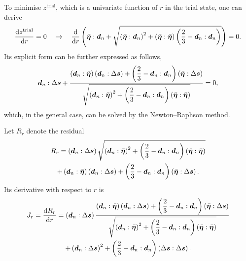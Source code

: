 To minimise $z^\text{trial}$, which is a univariate function of $r$ in the trial state, one can derive
\begin{gather}
    \dfrac{\mathrm{d}z^\text{trial}}{\mathrm{d}r}=0\quad\rightarrow\quad
    \dfrac{\mathrm{d}}{\mathrm{d}r}\left(\bar{\bm{\eta}}:\bm{d}_n+\sqrt{\left(\bar{\bm{\eta}}:\bm{d}_n\right)^2+\left(\bar{\bm{\eta}}:\bar{\bm{\eta}}\right)\left(\dfrac{2}{3}-\bm{d}_n:\bm{d}_n\right)}\right)=0.
\end{gather}
Its explicit form can be further expressed as follows,
\begin{gather}
    \bm{d}_n:\Delta\bm{s}+\dfrac{\left(\bm{d}_n:\bar{\bm{\eta}}\right)\left(\bm{d}_n:\Delta\bm{s}\right)+\left(\dfrac{2}{3}-\bm{d}_n:\bm{d}_n\right)\left(\bar{\bm{\eta}}:\Delta\bm{s}\right)}{\sqrt{\left(\bm{d}_n:\bar{\bm{\eta}}\right)^2+\left(\dfrac{2}{3}-\bm{d}_n:\bm{d}_n\right)\left(\bar{\bm{\eta}}:\bar{\bm{\eta}}\right)}}=0,
\end{gather}
which, in the general case, can be solved by the Newton--Raphson method.

Let $R_r$ denote the residual
\begin{multline}\label{eq:z_residual}
    R_r=\left(\bm{d}_n:\Delta\bm{s}\right)\sqrt{\left(\bm{d}_n:\bar{\bm{\eta}}\right)^2+\left(\dfrac{2}{3}-\bm{d}_n:\bm{d}_n\right)\left(\bar{\bm{\eta}}:\bar{\bm{\eta}}\right)}\\
    +\left(\bm{d}_n:\bar{\bm{\eta}}\right)\left(\bm{d}_n:\Delta\bm{s}\right)+\left(\dfrac{2}{3}-\bm{d}_n:\bm{d}_n\right)\left(\bar{\bm{\eta}}:\Delta\bm{s}\right).
\end{multline}
Its derivative with respect to $r$ is
\begin{multline}\label{eq:z_derivative}
    J_r=\dfrac{\mathrm{d}R_r}{\mathrm{d}r}=\left(\bm{d}_n:\Delta\bm{s}\right)\dfrac{\left(\bm{d}_n:\bar{\bm{\eta}}\right)\left(\bm{d}_n:\Delta\bm{s}\right)+\left(\dfrac{2}{3}-\bm{d}_n:\bm{d}_n\right)\left(\bar{\bm{\eta}}:\Delta\bm{s}\right)}{\sqrt{\left(\bm{d}_n:\bar{\bm{\eta}}\right)^2+\left(\dfrac{2}{3}-\bm{d}_n:\bm{d}_n\right)\left(\bar{\bm{\eta}}:\bar{\bm{\eta}}\right)}}\\
    +\left(\bm{d}_n:\Delta\bm{s}\right)^2+\left(\dfrac{2}{3}-\bm{d}_n:\bm{d}_n\right)\left(\Delta\bm{s}:\Delta\bm{s}\right).
\end{multline}

